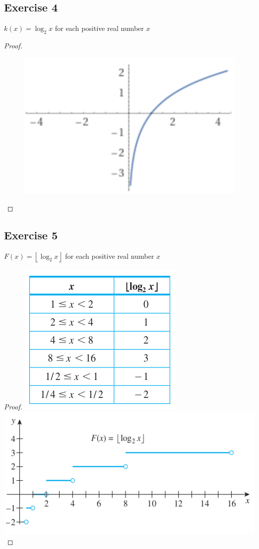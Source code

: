 \documentclass[14pt]{extarticle}
\newcommand{\floor}[1]{{\left\lfloor#1\right\rfloor}}
\begin{document}
\subsection{Exercise 4}
\(k(x) = \log_2 x\) for each positive real number \(x\)

\begin{proof}
\begin{figure}[ht!]
\centering
\includegraphics[scale=0.5]{../images/11.4.4.png}
\end{figure}
\end{proof}

\subsection{Exercise 5}
\(F(x) = \floor{\log_2 x}\) for each positive real number \(x\)

\begin{proof}
\includegraphics[scale=0.5]{../images/11.4.5.1.png}
\includegraphics[scale=0.5]{../images/11.4.5.2.png}
\end{proof}
\end{document}
